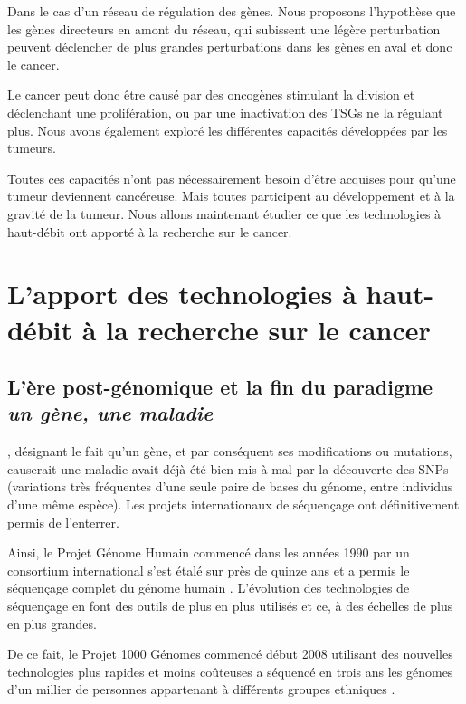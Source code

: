 			Dans le cas d'un réseau de régulation des gènes. Nous proposons l'hypothèse que les gènes directeurs en amont du réseau, qui subissent une légère perturbation peuvent déclencher de plus grandes perturbations dans les gènes en aval et donc le cancer.

			Le cancer peut donc être causé par des oncogènes stimulant la division et déclenchant une prolifération, ou par une inactivation des \acp{TSG} ne la régulant plus.
			Nous avons également exploré les différentes capacités développées par les tumeurs.

			Toutes ces capacités n'ont pas nécessairement besoin d'être acquises pour qu'une tumeur deviennent cancéreuse.
			Mais toutes participent au développement et à la gravité de la tumeur.
			Nous allons maintenant étudier ce que les technologies à haut-débit ont apporté à la recherche sur le cancer.

	\section{\textcolor{red!45!black}{L'apport des technologies à haut-débit à la recherche sur le cancer}}

		\subsection{\textcolor{red!45!black}{L'ère post-génomique et la fin du paradigme \emph{un gène, une maladie}}}
			, désignant le fait qu'un gène, et par conséquent ses modifications ou mutations, causerait une maladie avait déjà été bien mis à mal par la découverte des \acp{SNP} (variations très fréquentes d'une seule paire de bases du génome, entre individus d'une même espèce).
			Les projets internationaux de séquençage ont définitivement permis de l'enterrer.

			Ainsi, le Projet Génome Humain commencé dans les années 1990 par un consortium international s'est étalé sur près de quinze ans et a permis le séquençage complet du génome humain \citep{HGP2001}.
			L'évolution des technologies de séquençage en font des outils de plus en plus utilisés et ce, à des échelles de plus en plus grandes.

			De ce fait, le Projet 1000 Génomes commencé début 2008 utilisant des nouvelles technologies plus rapides et moins coûteuses a séquencé en trois ans les génomes d'un millier de personnes appartenant à différents groupes ethniques \citep{1000GPC2010}.


